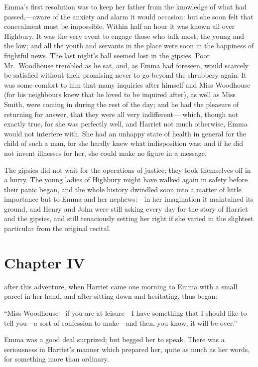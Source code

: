 Emma's first resolution was to keep her father from the knowledge
of what had passed,---aware of the anxiety and alarm it would occasion:
but she soon felt that concealment must be impossible.  Within half
an hour it was known all over Highbury.  It was the very event
to engage those who talk most, the young and the low; and all
the youth and servants in the place were soon in the happiness of
frightful news.  The last night's ball seemed lost in the gipsies.
Poor Mr.\ Woodhouse trembled as he sat, and, as Emma had foreseen,
would scarcely be satisfied without their promising never to go
beyond the shrubbery again.  It was some comfort to him that many
inquiries after himself and Miss Woodhouse (for his neighbours
knew that he loved to be inquired after), as well as Miss Smith,
were coming in during the rest of the day; and he had the pleasure
of returning for answer, that they were all very indifferent---%
which, though not exactly true, for she was perfectly well,
and Harriet not much otherwise, Emma would not interfere with.
She had an unhappy state of health in general for the child of such
a man, for she hardly knew what indisposition was; and if he did not
invent illnesses for her, she could make no figure in a message.

The gipsies did not wait for the operations of justice; they took
themselves off in a hurry.  The young ladies of Highbury might have
walked again in safety before their panic began, and the whole
history dwindled soon into a matter of little importance but to Emma
and her nephews:---in her imagination it maintained its ground,
and Henry and John were still asking every day for the story of
Harriet and the gipsies, and still tenaciously setting her right
if she varied in the slightest particular from the original recital.



\chapter{Chapter IV}


 after this adventure, when Harriet came
one morning to Emma with a small parcel in her hand, and after
sitting down and hesitating, thus began:

``Miss Woodhouse---if you are at leisure---I have something that I
should like to tell you---a sort of confession to make---and then,
you know, it will be over.''

Emma was a good deal surprized; but begged her to speak.
There was a seriousness in Harriet's manner which prepared her,
quite as much as her words, for something more than ordinary.

